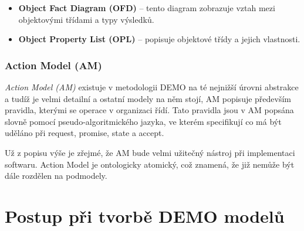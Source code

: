 \begin{itemize}
\item \textbf{Object Fact Diagram (OFD)} – tento diagram zobrazuje vztah mezi objektovými třídami a typy výsledků.
\item \textbf{Object Property List (OPL)} – popisuje objektové třídy a jejich vlastnosti.
\end{itemize}

\subsubsection{Action Model (AM)}
\textit{Action Model (AM)} existuje v metodologii DEMO na té nejnižší úrovni abstrakce a tudíž je velmi detailní a ostatní modely na něm stojí, AM popisuje především pravidla, kterými se operace v organizaci řídí. Tato pravidla jsou v AM popsána slovně pomocí pseudo-algoritmického jazyka, ve kterém specifikují co má být uděláno při request, promise, state a accept.

Už z popisu výše je zřejmé, že AM bude velmi užitečný nástroj při implementaci softwaru. Action Model je ontologicky atomický, což znamená, že již nemůže být dále rozdělen na podmodely.

\section{Postup při tvorbě DEMO modelů}
